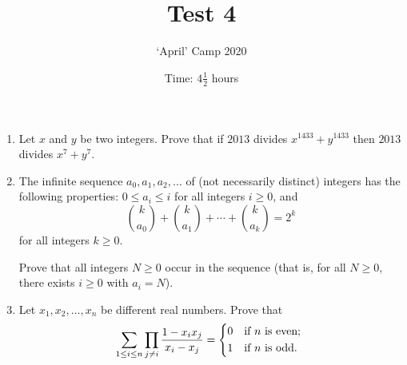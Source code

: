 \documentclass[12pt]{article}
\title{Test 4}
\author{`April' Camp 2020}
\date{Time: $4\frac{1}{2}$ hours}
\begin{document}
\maketitle
\thispagestyle{empty}


\begin{enumerate}[1.]

\vfill
\item %
Let $x$ and $y$ be two integers.
Prove that if $2013$ divides $x^{1433}+y^{1433}$ then $2013$ divides $x^7+y^7$.


\vfill
\item %
The infinite sequence $a_0, a_1, a_2, \dotsc$ of (not necessarily distinct) integers has the following properties: $0 \leq a_i \leq i$ for all integers $i \geq 0$, and
\[ \binom{k}{a_0} +\binom{k}{a_1} +\dotsb +\binom{k}{a_k} = 2^k \]
for all integers $k \geq 0$.

Prove that all integers $N \geq 0$ occur in the sequence (that is, for all $N \geq 0$, there exists $i \geq 0$ with $a_i = N$).


\vfill
\item %
Let $x_1, x_2, \dotsc, x_n$ be different real numbers.
Prove that
\[ \sum_{1 \leq i \leq n} \prod_{j \neq i} \frac{1-x_ix_j}{x_i-x_j} = \begin{dcases*} 0 & if $n$ is even; \\ 1 & if $n$ is odd. \end{dcases*} \]

\vfill
\end{enumerate}
\end{document}
